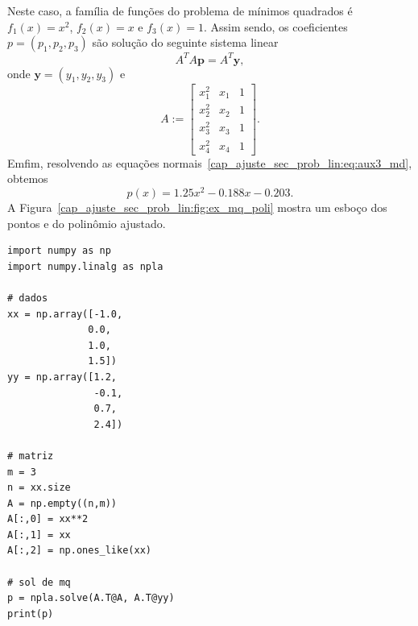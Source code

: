 \begin{ex}
  Neste caso, a família de funções do problema de mínimos quadrados é $f_1(x) = x^2$, $f_2(x) = x$ e $f_3(x) = 1$. Assim sendo, os coeficientes $p = (p_1, p_2, p_3)$ são solução do seguinte sistema linear
  \begin{equation}\label{cap_ajuste_sec_prob_lin:eq:aux3_md}
    A^TA\pmb{p} = A^T\pmb{y},
  \end{equation}
  onde $\pmb{y} = (y_1, y_2, y_3)$ e
  \begin{equation}
    A :=
    \begin{bmatrix}
      x_1^2 & x_1 & 1 \\
      x_2^2 & x_2 & 1 \\
      x_3^2 & x_3 & 1 \\
      x_4^2 & x_4 & 1
    \end{bmatrix}.
  \end{equation}
  Emfim, resolvendo as equações normais~\eqref{cap_ajuste_sec_prob_lin:eq:aux3_md}, obtemos
  \begin{equation}
    p(x) = 1.25x^2 -0.188x - 0.203.
  \end{equation}
  A Figura~\ref{cap_ajuste_sec_prob_lin:fig:ex_mq_poli} mostra um esboço dos pontos e do polinômio ajustado.

\begin{lstlisting}[caption=mqPoli.py]
import numpy as np
import numpy.linalg as npla

# dados
xx = np.array([-1.0,
              0.0,
              1.0,
              1.5])
yy = np.array([1.2,
               -0.1,
               0.7,
               2.4])

# matriz
m = 3
n = xx.size
A = np.empty((n,m))
A[:,0] = xx**2
A[:,1] = xx
A[:,2] = np.ones_like(xx)

# sol de mq
p = npla.solve(A.T@A, A.T@yy)
print(p)
\end{lstlisting}  
\end{ex}


